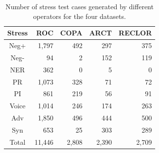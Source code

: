 
\begin{table}[th]
\centering
\scriptsize
\begin{tabular}{c|rrrr}
\toprule
\textbf{Stress} & \textbf{ROC} & \textbf{COPA} & \textbf{ARCT} & \textbf{RECLOR} \\ \midrule
Neg+  &	1,797&492&	297&375	\\ \hline
Neg-  &	94&	2&	152&	119\\ \hline
NER  &	362&	0&	5&0	\\ \hline
PR  &	1,073&	328&71&72	\\ \hline
PI  &	     861&	219&	56&	91\\  \hline
Voice  &	1,014&246	&174	&263	\\  \midrule
Adv  &	1,850&496	&444	&500	\\ \hline
Syn&	653&	 25&	303&289	\\ \midrule

Total & 11,446  &  2,808 & 2,390 & 2,709 \\ \bottomrule
\end{tabular}
\caption{Number of stress test cases \protect\footnotemark generated
by different operators for the four datasets.}
\label{tab:cases}
\end{table}



\iffalse

